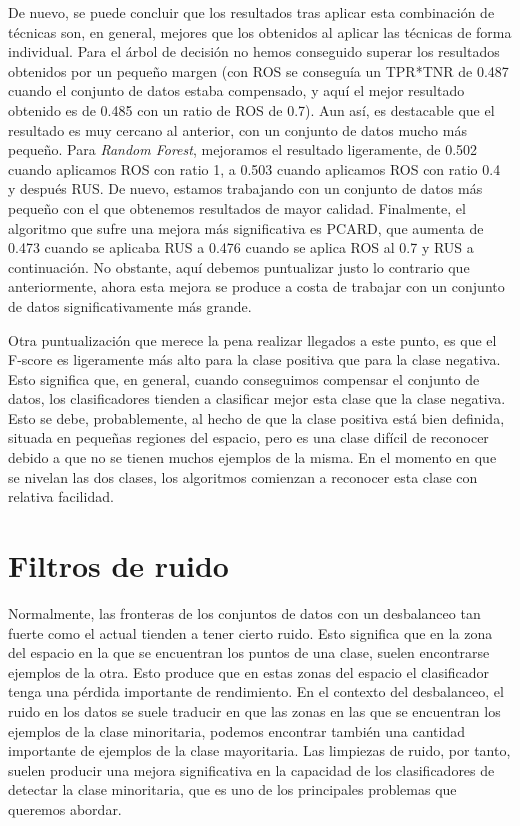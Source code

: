 \documentclass[
  a4paper,
,tablecaptionabove
]{scrartcl}
\begin{document}
De nuevo, se puede concluir que los resultados tras aplicar esta
combinación de técnicas son, en general, mejores que los obtenidos al
aplicar las técnicas de forma individual. Para el árbol de decisión no
hemos conseguido superar los resultados obtenidos por un pequeño margen
(con ROS se conseguía un TPR*TNR de 0.487 cuando el conjunto de datos
estaba compensado, y aquí el mejor resultado obtenido es de 0.485 con un
ratio de ROS de 0.7). Aun así, es destacable que el resultado es muy
cercano al anterior, con un conjunto de datos mucho más pequeño. Para
\emph{Random Forest}, mejoramos el resultado ligeramente, de 0.502
cuando aplicamos ROS con ratio 1, a 0.503 cuando aplicamos ROS con ratio
0.4 y después RUS. De nuevo, estamos trabajando con un conjunto de datos
más pequeño con el que obtenemos resultados de mayor calidad.
Finalmente, el algoritmo que sufre una mejora más significativa es
PCARD, que aumenta de 0.473 cuando se aplicaba RUS a 0.476 cuando se
aplica ROS al 0.7 y RUS a continuación. No obstante, aquí debemos
puntualizar justo lo contrario que anteriormente, ahora esta mejora se
produce a costa de trabajar con un conjunto de datos significativamente
más grande.

Otra puntualización que merece la pena realizar llegados a este punto,
es que el F-score es ligeramente más alto para la clase positiva que
para la clase negativa. Esto significa que, en general, cuando
conseguimos compensar el conjunto de datos, los clasificadores tienden a
clasificar mejor esta clase que la clase negativa. Esto se debe,
probablemente, al hecho de que la clase positiva está bien definida,
situada en pequeñas regiones del espacio, pero es una clase difícil de
reconocer debido a que no se tienen muchos ejemplos de la misma. En el
momento en que se nivelan las dos clases, los algoritmos comienzan a
reconocer esta clase con relativa facilidad.

\hypertarget{filtros-de-ruido}{%
\section{Filtros de ruido}\label{filtros-de-ruido}}

Normalmente, las fronteras de los conjuntos de datos con un desbalanceo
tan fuerte como el actual tienden a tener cierto ruido. Esto significa
que en la zona del espacio en la que se encuentran los puntos de una
clase, suelen encontrarse ejemplos de la otra. Esto produce que en estas
zonas del espacio el clasificador tenga una pérdida importante de
rendimiento. En el contexto del desbalanceo, el ruido en los datos se
suele traducir en que las zonas en las que se encuentran los ejemplos de
la clase minoritaria, podemos encontrar también una cantidad importante
de ejemplos de la clase mayoritaria. Las limpiezas de ruido, por tanto,
suelen producir una mejora significativa en la capacidad de los
clasificadores de detectar la clase minoritaria, que es uno de los
principales problemas que queremos abordar.
\end{document}
